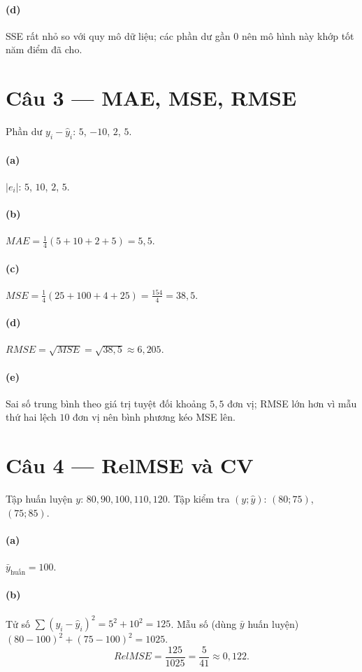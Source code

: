 \paragraph{(d)} SSE rất nhỏ so với quy mô dữ liệu; các phần dư gần $0$ nên mô hình này khớp tốt năm điểm đã cho.

\section*{Câu 3 --- MAE, MSE, RMSE}
Phần dư $y_i-\hat y_i$: $5$, $-10$, $2$, $5$.

\paragraph{(a)} $|e_i|$: $5$, $10$, $2$, $5$.

\paragraph{(b)} $MAE=\frac{1}{4}(5+10+2+5)=5{,}5$.

\paragraph{(c)} $MSE=\frac{1}{4}(25+100+4+25)=\frac{154}{4}=38{,}5$.

\paragraph{(d)} $RMSE=\sqrt{MSE}=\sqrt{38{,}5}\approx 6{,}205$.

\paragraph{(e)} Sai số trung bình theo giá trị tuyệt đối khoảng $5{,}5$ đơn vị; RMSE lớn hơn vì mẫu thứ hai lệch $10$ đơn vị nên bình phương kéo MSE lên.

\section*{Câu 4 --- RelMSE và CV}
Tập huấn luyện $y$: $80,90,100,110,120$. Tập kiểm tra $(y;\hat y)$: $(80;75)$, $(75;85)$.

\paragraph{(a)} $\bar y_{\text{huấn}}=100$.

\paragraph{(b)} Tử số $\sum (y_i-\hat y_i)^2=5^2+10^2=125$. Mẫu số (dùng $\bar y$ huấn luyện) $(80-100)^2+(75-100)^2=1025$.
\[
RelMSE=\frac{125}{1025}=\frac{5}{41}\approx 0{,}122.
\]


